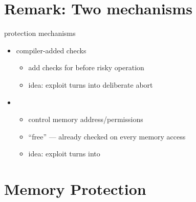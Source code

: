 \section{Remark: Two mechanisms}

\begin{frame}{protection mechanisms}
    \begin{itemize}
    \item compiler-added checks
        \begin{itemize}
        \item add checks for before risky operation
        \item idea: exploit turns into deliberate abort
        \end{itemize}
    \item {}
        \begin{itemize}
        \item control memory address/permissions
        \item ``free'' --- already checked on every memory access
        \item idea: exploit turns into 
        \end{itemize}
    \end{itemize}
\end{frame}

\section{Memory Protection}

